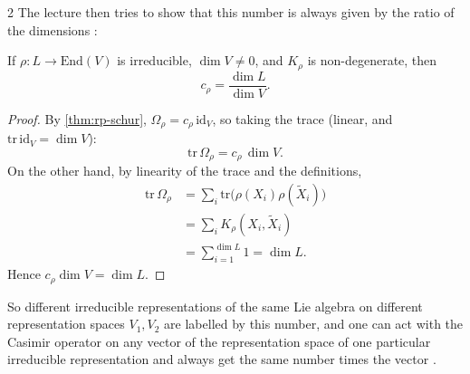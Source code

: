\begin{paracol}{2}
The lecture then tries to show that this number is always given by the ratio of the dimensions  :
\begin{theorem}\label{thm:rp-value}
If $\rho\colon L\to\mathrm{End}(V)$ is irreducible, $\dim V\ne0$, and $K_\rho$ is non-degenerate, then
\[
  c_\rho=\frac{\dim L}{\dim V}.
\]
\end{theorem}
\begin{proof}
By \cref{thm:rp-schur}, $\Omega_\rho=c_\rho\,\mathrm{id}_V$, so taking the trace (linear, and $\mathrm{tr}\,\mathrm{id}_V=\dim V$):
\[
  \mathrm{tr}\,\Omega_\rho=c_\rho\,\dim V .
\]
On the other hand, by linearity of the trace and the definitions,
\[
  \begin{aligned}
  \mathrm{tr}\,\Omega_\rho&=\sum_i\mathrm{tr}\bigl(\rho(X_i)\rho(\tilde X_i)\bigr)\\
  &=\sum_iK_\rho(X_i,\tilde X_i)\\
  &=\sum_{i=1}^{\dim L}1=\dim L .
  \end{aligned}
\]
Hence $c_\rho\dim V=\dim L$.       
\end{proof}
So different irreducible representations of the same Lie algebra on different representation spaces $V_1,V_2$ are labelled by this number, and one can act with the Casimir operator on any vector of the representation space of one particular irreducible representation and always get the same number times the vector  .


\end{paracol}
